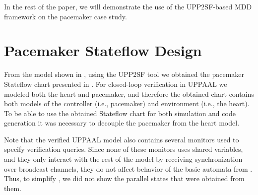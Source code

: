 In the rest of the paper, we will demonstrate the use of the UPP2SF-based MDD framework on the pacemaker case study. 

\section{Pacemaker Stateflow Design}
\label{sec:pm_sf}

From the model shown in , using the UPP2SF tool we obtained the pacemaker Stateflow chart presented in . For closed-loop verification in UPPAAL we modeled both the heart and pacemaker, and therefore the obtained chart contains both models of the controller (i.e., pacemaker) and environment (i.e., the heart). To be able to use the obtained Stateflow chart for both simulation and code generation it was necessary to decouple the pacemaker from the heart model. 

Note that the verified UPPAAL model also contains several monitors used to specify verification queries. Since none of these monitors uses shared variables, and they only interact with the rest of the model by receiving synchronization over broadcast channels, they do not affect behavior of the basic automata from . Thus, to simplify , we did not show the parallel states that were obtained from them. 



